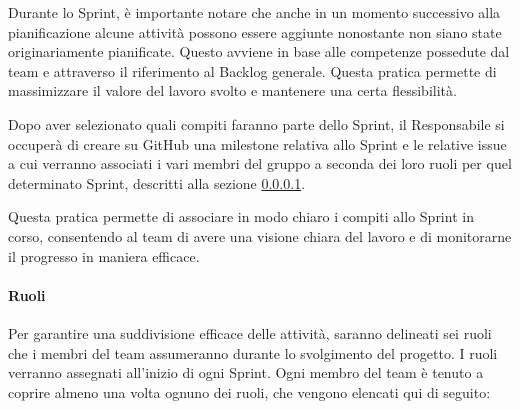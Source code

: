         \noindent
        Durante lo Sprint, è importante notare che anche in un momento successivo alla pianificazione alcune attività possono essere aggiunte nonostante non siano state originariamente pianificate. Questo avviene in base alle competenze possedute dal team e attraverso il riferimento al Backlog generale. Questa pratica permette di massimizzare il valore del lavoro svolto e mantenere una certa flessibilità.

        \vspace{0.3cm}
        \noindent
        Dopo aver selezionato quali compiti faranno parte dello Sprint, il Responsabile si occuperà di creare su GitHub una milestone relativa allo Sprint e le relative issue a cui verranno associati i vari membri del gruppo a seconda dei loro ruoli per quel determinato Sprint, descritti alla sezione \ref{sec:ruoli}. 

        \noindent
        Questa pratica permette di associare in modo chiaro i compiti allo Sprint in corso, consentendo al team di avere una visione chiara del lavoro e di monitorarne il progresso in maniera efficace.

        \paragraph{Ruoli} \label{sec:ruoli}
        Per garantire una suddivisione efficace delle attività, saranno delineati sei ruoli che i membri del team assumeranno durante lo svolgimento del progetto. 
        I ruoli verranno assegnati all'inizio di ogni Sprint.
        Ogni membro del team è tenuto a coprire almeno una volta ognuno dei ruoli, che vengono elencati qui di seguito:
        
